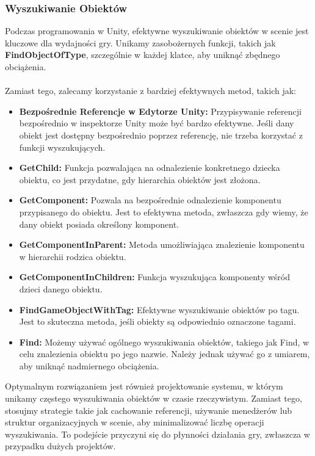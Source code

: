 \subsubsection{Wyszukiwanie Obiektów}
Podczas programowania w Unity, efektywne wyszukiwanie obiektów w scenie jest kluczowe dla wydajności gry. Unikamy zasobożernych funkcji, takich jak \textbf{FindObjectOfType}, szczególnie w każdej klatce, aby uniknąć zbędnego obciążenia.\\ \\
Zamiast tego, zalecamy korzystanie z bardziej efektywnych metod, takich jak:
\begin{itemize}
    \item \textbf{Bezpośrednie Referencje w Edytorze Unity:} Przypisywanie referencji bezpośrednio w inspektorze Unity może być bardzo efektywne. Jeśli dany obiekt jest dostępny bezpośrednio poprzez referencję, nie trzeba korzystać z funkcji wyszukujących.
    \item \textbf{GetChild:} Funkcja pozwalająca na odnalezienie konkretnego dziecka obiektu, co jest przydatne, gdy hierarchia obiektów jest złożona.
    \item \textbf{GetComponent:} Pozwala na bezpośrednie odnalezienie komponentu przypisanego do obiektu. Jest to efektywna metoda, zwłaszcza gdy wiemy, że dany obiekt posiada określony komponent.
    \item \textbf{GetComponentInParent:} Metoda umożliwiająca znalezienie komponentu w hierarchii rodzica obiektu.
    \item \textbf{GetComponentInChildren:} Funkcja wyszukująca komponenty wśród dzieci danego obiektu.
    \item \textbf{FindGameObjectWithTag:} Efektywne wyszukiwanie obiektów po tagu. Jest to skuteczna metoda, jeśli obiekty są odpowiednio oznaczone tagami.
    \item \textbf{Find:} Możemy używać ogólnego wyszukiwania obiektów, takiego jak Find, w celu znalezienia obiektu po jego nazwie. Należy jednak używać go z umiarem, aby uniknąć nadmiernego obciążenia.
\end{itemize}
Optymalnym rozwiązaniem jest również projektowanie systemu, w którym unikamy częstego wyszukiwania obiektów w czasie rzeczywistym. Zamiast tego, stosujmy strategie takie jak cachowanie referencji, używanie menedżerów lub struktur organizacyjnych w scenie, aby minimalizować liczbę operacji wyszukiwania. To podejście przyczyni się do płynności działania gry, zwłaszcza w przypadku dużych projektów.
